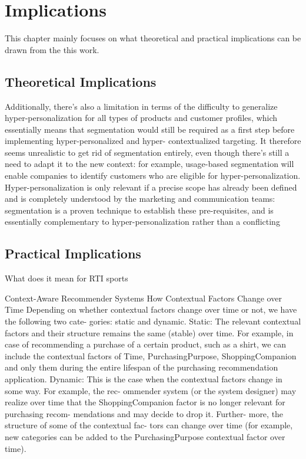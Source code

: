 \chapter{Implications} \label{chap:chapter_7}
This chapter mainly focuses on what theoretical and practical implications can be drawn from the this work.

\section{Theoretical Implications} \label{sect:thefirst}

Additionally, there’s also a limitation in terms of the difficulty to generalize hyper-personalization for all types of products and customer profiles, which essentially means that segmentation would still be required as a first step before implementing hyper-personalized and hyper- contextualized targeting.
It therefore seems unrealistic to get rid of segmentation entirely, even though there’s still a need to adapt it to the new context: for example, usage-based segmentation will enable companies to identify customers who are eligible for hyper-personalization. Hyper-personalization is only relevant if a precise scope has already been defined and is completely understood by the marketing and communication teams: segmentation is a proven technique to establish these pre-requisites, and is essentially complementary to hyper-personalization rather than a conflicting
\autocite[3]{CapgeminiconsultingESSECBusinessSchool2016}


\section{Practical Implications}
What does it mean for RTI sports 

Context-Aware Recommender Systems 
How Contextual Factors Change over Time
Depending on whether contextual factors change over time or not, we have the following two cate- gories: static and dynamic. Static: The relevant contextual factors and their structure remains the same (stable) over time. For example, in case of recommending a purchase of a certain product, such as a shirt, we can include the contextual factors of Time, PurchasingPurpose, ShoppingCompanion and only them during the entire lifespan of the purchasing recommendation application. Dynamic: This is the case when the contextual factors change in some way. For example, the rec- ommender system (or the system designer) may realize over time that the ShoppingCompanion factor is no longer relevant for purchasing recom- mendations and may decide to drop it. Further- more, the structure of some of the contextual fac- tors can change over time (for example, new categories can be added to the PurchasingPurpose contextual factor over time).



